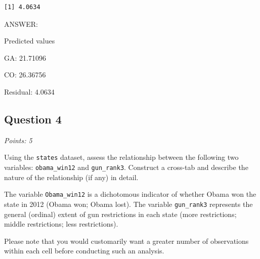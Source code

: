 \documentclass[
  letterpaper,
  DIV=11,
  numbers=noendperiod]{scrartcl}
\begin{document}
\begin{verbatim}
[1] 4.0634
\end{verbatim}

ANSWER:

Predicted values

GA: 21.71096

CO: 26.36756

Residual: 4.0634

\hypertarget{question-4}{%
\subsection{Question 4}\label{question-4}}

\emph{Points: 5}

Using the \texttt{states} dataset, assess the relationship between the
following two variables: \texttt{obama\_win12} and \texttt{gun\_rank3}.
Construct a cross-tab and describe the nature of the relationship (if
any) in detail.

\begin{tcolorbox}[enhanced jigsaw, opacitybacktitle=0.6, bottomtitle=1mm, coltitle=black, colback=white, colframe=quarto-callout-note-color-frame, toprule=.15mm, leftrule=.75mm, breakable, left=2mm, bottomrule=.15mm, toptitle=1mm, arc=.35mm, titlerule=0mm, title=\textcolor{quarto-callout-note-color}{\faInfo}\hspace{0.5em}{Note}, opacityback=0, colbacktitle=quarto-callout-note-color!10!white, rightrule=.15mm]

The variable \texttt{Obama\_win12} is a dichotomous indicator of whether
Obama won the state in 2012 (Obama won; Obama lost). The variable
\texttt{gun\_rank3} represents the general (ordinal) extent of gun
restrictions in each state (more restrictions; middle restrictions; less
restrictions).

\end{tcolorbox}

\begin{tcolorbox}[enhanced jigsaw, opacitybacktitle=0.6, bottomtitle=1mm, coltitle=black, colback=white, colframe=quarto-callout-caution-color-frame, toprule=.15mm, leftrule=.75mm, breakable, left=2mm, bottomrule=.15mm, toptitle=1mm, arc=.35mm, titlerule=0mm, title=\textcolor{quarto-callout-caution-color}{\faFire}\hspace{0.5em}{Caution}, opacityback=0, colbacktitle=quarto-callout-caution-color!10!white, rightrule=.15mm]

Please note that you would customarily want a greater number of
observations within each cell before conducting such an analysis.

\end{tcolorbox}
\end{document}
